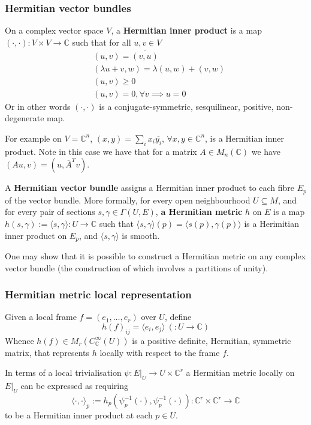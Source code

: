 \documentclass[a4paper]{article}
\theoremstyle{definition} \newtheorem*{definition}{Definition}
\theoremstyle{definition} \newtheorem*{definitions}{Definitions}
\theoremstyle{plain} \newtheorem{theorem}{Theorem}[section]
\theoremstyle{plain} \newtheorem{proposition}[theorem]{Proposition}
\theoremstyle{plain} \newtheorem{corollary}[theorem]{Corollary}
\theoremstyle{plain} \newtheorem{lemma}[theorem]{Lemma}
\theoremstyle{plain} \newtheorem{example}[theorem]{Example}
\newcommand{\defn}[1]{\textbf{#1}}
\newcommand{\complexnos}{\mathbb{C}}
\newcommand{\smoothCmaps}{C^\infty_\complexnos (U)}
\begin{document}
\subsubsection{Hermitian vector bundles}
On a complex vector space $V$, a \defn{Hermitian inner product} is a map $(\cdot, \cdot):V\times V\to \complexnos$ such that for all $u,v\in V$
\begin{align*}
& (u,v)=\overline{(v, u)} \\
& (\lambda u + v, w) = \lambda (u, w) + (v, w) \\
& (u, v)\geq 0 \\
& (u,v)=0, \forall v \implies u=0
\end{align*}
Or in other words $(\cdot, \cdot)$ is a conjugate-symmetric, sesquilinear, positive, non-degenerate map. 

For example on $V=\complexnos^n$, $(x, y)=\sum_i x_i\overline{y_i}$, $\forall x,y\in \complexnos^n$, is a Hermitian inner product. Note in this case we have that for a matrix $A\in M_n(\complexnos)$ we have $(Au, v)=(u, \overline{A}^Tv)$.

A \defn{Hermitian vector bundle} assigns a Hermitian inner product to each fibre $E_p$ of the vector bundle. More formally, for every open neighbourhood $U\subseteq M$, and for every pair of sections $s, \gamma \in \Gamma(U, E)$, \defn{a Hermitian metric} $h$ on $E$ is a map $h(s, \gamma):=\langle s, \gamma \rangle:U\to \complexnos$ such that $\langle s, \gamma \rangle(p)=\langle s(p), \gamma (p) \rangle$ is a Herimitian inner product on $E_p$, and $\langle s, \gamma \rangle$ is smooth. 

One may show that it is possible to construct a Hermitian metric on any complex vector bundle (the construction of which involves a partitions of unity). 

\subsubsection{Hermitian metric local representation}
Given a local frame $f=(e_1, \ldots, e_r)$ over $U$, define 
$$h(f)_{ij}=\langle e_i, e_j \rangle \ (:U\to \complexnos)$$
Whence $h(f)\in M_r(\smoothCmaps)$ is a positive definite, Hermitian, symmetric matrix, that represents $h$ locally with respect to the frame $f$. 

In terms of a local trivialisation $\psi:E|_U\to U\times \complexnos^r$ a Hermitian metric locally on $E|_U$ can be expressed as requiring
$$\langle \cdot, \cdot \rangle_p := h_p(\psi^{-1}_p(\cdot), \psi^{-1}_p(\cdot)):\complexnos^r \times \complexnos^r \to \complexnos$$
to be a Hermitian inner product at each $p\in U$. 
\end{document}
